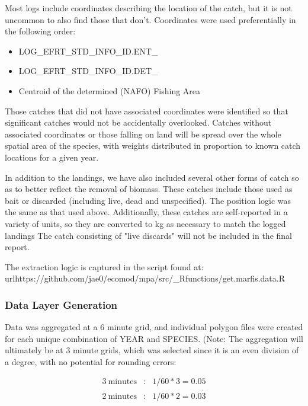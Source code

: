 \documentclass[letterpaper,portrait,11pt]{scrartcl}
\numberwithin{equation}{section}		%
\numberwithin{figure}{section}			%
\numberwithin{table}{section}				%
\begin{document}
Most logs include coordinates describing the location of the catch, but it is not uncommon to also find those that don't.  Coordinates were used preferentially in the following order:
\begin{itemize}
  \item LOG\_EFRT\_STD\_INFO\_ID.ENT\_
  \item LOG\_EFRT\_STD\_INFO\_ID.DET\_
  \item Centroid of the determined (NAFO) Fishing Area
\end{itemize}

Those catches that did not have associated coordinates were identified so that significant catches would not be accidentally overlooked. Catches without associated coordinates or those falling on land will be spread over the whole spatial area of the species, with weights distributed in proportion to known catch locations for a given year.

In addition to the landings, we have also included several other forms of catch so as to better reflect the removal of biomass. These catches include those used as bait or discarded (including live, dead and unspecified). The position logic was the same as that used above. Additionally, these catches are self-reported in a variety of units, so they are converted to kg as necessary to match the logged landings The catch consisting of "live discards" will not be included in the final report.

The extraction logic is captured in the script found at: \\

 url{https://github.com/jae0/ecomod/mpa/src/\_Rfunctions/get.marfis.data.R}

\subsubsection{Data Layer Generation}

Data was aggregated at a 6 minute grid, and individual polygon files were created for each unique combination of YEAR and SPECIES. (Note: The aggregation will ultimately be at 3 minute grids, which was selected since it is an even division of a degree, with no potential for rounding errors: 

\begin{eqnarray*}
3 \: \text{minutes} &:& 1/60*3 = 0.05 \\
2 \: \text{minutes} &:& 1/60*2 = 0.0\dot{3}
\end{eqnarray*}
\end{document}
